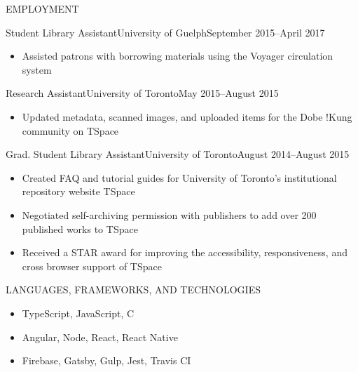\documentclass[]{mcdowellcv}
\begin{document}
	\begin{cvsection}{EMPLOYMENT}
		\begin{cvsubsection}{Student Library Assistant}{University of Guelph}{September 2015--April 2017}
			\begin{itemize}
				\item Assisted patrons with borrowing materials using the Voyager circulation system
			\end{itemize}
		\end{cvsubsection}
		
		\begin{cvsubsection}{Research Assistant}{University of Toronto}{May 2015--August 2015}	
			\begin{itemize}
				\item Updated metadata, scanned images, and uploaded items for the Dobe !Kung community on TSpace
			\end{itemize}
		\end{cvsubsection}
		
		\begin{cvsubsection}{Grad. Student Library Assistant}{University of Toronto}{August 2014--August 2015}		
			\begin{itemize}
	    			\item Created FAQ and tutorial guides for University of Toronto's institutional repository website TSpace
               			\item Negotiated self-archiving permission with publishers to add over 200 published works to TSpace
               			\item Received a STAR award for improving the accessibility, responsiveness, and cross browser support of TSpace 
			\end{itemize}
		\end{cvsubsection}
		
	\end{cvsection}

	\begin{cvsection}{LANGUAGES, FRAMEWORKS, AND TECHNOLOGIES}
		\begin{cvsubsection}{}{}{}	
			\begin{itemize}
				\item TypeScript, JavaScript, C
				\item Angular, Node, React, React Native
				\item Firebase, Gatsby, Gulp, Jest, Travis CI
			\end{itemize}
		\end{cvsubsection}
	\end{cvsection}
	
\end{document}
